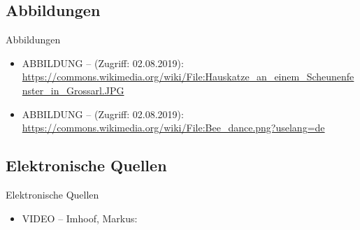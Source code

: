 %
%	
%
%	
%
%
%

\subsection*{Abbildungen}

\begin{frame}{Abbildungen}
	
	
	\begin{itemize}
		\item ABBILDUNG --  (Zugriff: 02.08.2019): \url{https://commons.wikimedia.org/wiki/File:Hauskatze\_an\_einem\_Scheunenfenster\_in\_Grossarl.JPG}
		\medskip
		\item ABBILDUNG --  (Zugriff: 02.08.2019):
		\url{https://commons.wikimedia.org/wiki/File:Bee\_dance.png?uselang=de}
	\end{itemize}	
	
\end{frame}


\subsection*{Elektronische Quellen}

\begin{frame}{Elektronische Quellen}
	
	
	
	\begin{itemize}
		\item VIDEO -- Imhoof, Markus:  %
	\end{itemize}
	
\end{frame}

